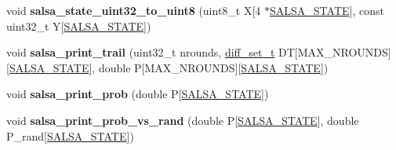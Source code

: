 \begin{DoxyCompactItemize}
\item 
\hypertarget{salsa_8hh_a88c3d454fe1dd19fad385a8da5977073}{void {\bfseries salsa\-\_\-state\-\_\-uint32\-\_\-to\-\_\-uint8} (uint8\-\_\-t \-X\mbox{[}4 $\ast$\hyperlink{salsa_8hh_a642186115ff24eb2f42febb3ccaa093f}{\-S\-A\-L\-S\-A\-\_\-\-S\-T\-A\-T\-E}\mbox{]}, const uint32\-\_\-t \-Y\mbox{[}\hyperlink{salsa_8hh_a642186115ff24eb2f42febb3ccaa093f}{\-S\-A\-L\-S\-A\-\_\-\-S\-T\-A\-T\-E}\mbox{]})}\label{salsa_8hh_a88c3d454fe1dd19fad385a8da5977073}

\item 
\hypertarget{salsa_8hh_a45063cc798f47435afc6969418d1b280}{void {\bfseries salsa\-\_\-print\-\_\-trail} (uint32\-\_\-t nrounds, \hyperlink{structdiff__set__t}{diff\-\_\-set\-\_\-t} \-D\-T\mbox{[}\-M\-A\-X\-\_\-\-N\-R\-O\-U\-N\-D\-S\mbox{]}\mbox{[}\hyperlink{salsa_8hh_a642186115ff24eb2f42febb3ccaa093f}{\-S\-A\-L\-S\-A\-\_\-\-S\-T\-A\-T\-E}\mbox{]}, double \-P\mbox{[}\-M\-A\-X\-\_\-\-N\-R\-O\-U\-N\-D\-S\mbox{]}\mbox{[}\hyperlink{salsa_8hh_a642186115ff24eb2f42febb3ccaa093f}{\-S\-A\-L\-S\-A\-\_\-\-S\-T\-A\-T\-E}\mbox{]})}\label{salsa_8hh_a45063cc798f47435afc6969418d1b280}

\item 
\hypertarget{salsa_8hh_a0010e7e3d0dbc6640950be30a496ec1e}{void {\bfseries salsa\-\_\-print\-\_\-prob} (double \-P\mbox{[}\hyperlink{salsa_8hh_a642186115ff24eb2f42febb3ccaa093f}{\-S\-A\-L\-S\-A\-\_\-\-S\-T\-A\-T\-E}\mbox{]})}\label{salsa_8hh_a0010e7e3d0dbc6640950be30a496ec1e}

\item 
\hypertarget{salsa_8hh_a4cd595a2aec8057b648c8414e6fdbe7f}{void {\bfseries salsa\-\_\-print\-\_\-prob\-\_\-vs\-\_\-rand} (double \-P\mbox{[}\hyperlink{salsa_8hh_a642186115ff24eb2f42febb3ccaa093f}{\-S\-A\-L\-S\-A\-\_\-\-S\-T\-A\-T\-E}\mbox{]}, double \-P\-\_\-rand\mbox{[}\hyperlink{salsa_8hh_a642186115ff24eb2f42febb3ccaa093f}{\-S\-A\-L\-S\-A\-\_\-\-S\-T\-A\-T\-E}\mbox{]})}\label{salsa_8hh_a4cd595a2aec8057b648c8414e6fdbe7f}


\end{DoxyCompactItemize}
